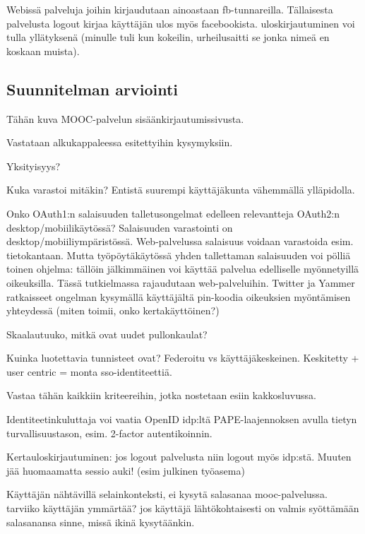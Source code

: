 \documentclass[finnish,gradu]{tktltiki}
\begin{document}
  Webissä palveluja joihin kirjaudutaan ainoastaan fb-tunnareilla. Tällaisesta palvelusta logout kirjaa käyttäjän ulos myös facebookista. uloskirjautuminen voi tulla yllätyksenä (minulle tuli kun kokeilin, urheilusaitti se jonka nimeä en koskaan muista).




  \subsection{Suunnitelman arviointi} %
  \label{sub:suunnitelman_arviointi}

  Tähän kuva MOOC-palvelun sisäänkirjautumissivusta.

  Vastataan alkukappaleessa esitettyihin kysymyksiin.

  Yksityisyys? %

  Kuka varastoi mitäkin? Entistä suurempi käyttäjäkunta vähemmällä ylläpidolla.

  Onko OAuth1:n salaisuuden talletusongelmat edelleen relevantteja OAuth2:n desktop/mobiilikäytössä?
  Salaisuuden varastointi on desktop/mobiiliympäristössä. Web-palvelussa salaisuus voidaan varastoida esim. tietokantaan. Mutta työpöytäkäytössä yhden tallettaman salaisuuden voi pölliä toinen ohjelma: tällöin jälkimmäinen voi käyttää palvelua edelliselle myönnetyillä oikeuksilla. Tässä tutkielmassa rajaudutaan web-palveluihin. Twitter ja Yammer ratkaisseet ongelman kysymällä käyttäjältä pin-koodia oikeuksien myöntämisen yhteydessä (miten toimii, onko kertakäyttöinen?) %

  Skaalautuuko, mitkä ovat uudet pullonkaulat?

  Kuinka luotettavia tunnisteet ovat? Federoitu vs käyttäjäkeskeinen. Keskitetty + user centric = monta sso-identiteettiä.

  Vastaa tähän kaikkiin kriteereihin, jotka nostetaan esiin kakkosluvussa.

  Identiteetinkuluttaja voi vaatia OpenID idp:ltä PAPE-laajennoksen avulla tietyn turvallisuustason, esim. 2-factor autentikoinnin.

  Kertauloskirjautuminen: jos logout palvelusta niin logout myös idp:stä. Muuten jää huomaamatta sessio auki! (esim julkinen työasema)

  Käyttäjän nähtävillä selainkonteksti, ei kysytä salasanaa mooc-palvelussa. tarviiko käyttäjän ymmärtää? jos käyttäjä lähtökohtaisesti on valmis syöttämään salasanansa sinne, missä ikinä kysytäänkin.
\end{document}
